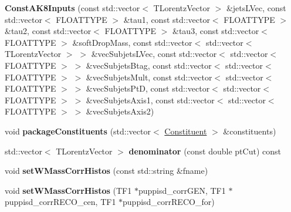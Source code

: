 \begin{DoxyCompactItemize}
\item 
\hypertarget{classttUtility_1_1ConstAK8Inputs_a1376ef57da464077cf28555182ac6ed0}{{\bfseries Const\-A\-K8\-Inputs} (const std\-::vector$<$ T\-Lorentz\-Vector $>$ \&jets\-L\-Vec, const std\-::vector$<$ F\-L\-O\-A\-T\-T\-Y\-P\-E $>$ \&tau1, const std\-::vector$<$ F\-L\-O\-A\-T\-T\-Y\-P\-E $>$ \&tau2, const std\-::vector$<$ F\-L\-O\-A\-T\-T\-Y\-P\-E $>$ \&tau3, const std\-::vector$<$ F\-L\-O\-A\-T\-T\-Y\-P\-E $>$ \&soft\-Drop\-Mass, const std\-::vector$<$ std\-::vector$<$ T\-Lorentz\-Vector $>$ $>$ \&vec\-Subjets\-L\-Vec, const std\-::vector$<$ std\-::vector$<$ F\-L\-O\-A\-T\-T\-Y\-P\-E $>$ $>$ \&vec\-Subjets\-Btag, const std\-::vector$<$ std\-::vector$<$ F\-L\-O\-A\-T\-T\-Y\-P\-E $>$ $>$ \&vec\-Subjets\-Mult, const std\-::vector$<$ std\-::vector$<$ F\-L\-O\-A\-T\-T\-Y\-P\-E $>$ $>$ \&vec\-Subjets\-Pt\-D, const std\-::vector$<$ std\-::vector$<$ F\-L\-O\-A\-T\-T\-Y\-P\-E $>$ $>$ \&vec\-Subjets\-Axis1, const std\-::vector$<$ std\-::vector$<$ F\-L\-O\-A\-T\-T\-Y\-P\-E $>$ $>$ \&vec\-Subjets\-Axis2)}\label{classttUtility_1_1ConstAK8Inputs_a1376ef57da464077cf28555182ac6ed0}

\item 
\hypertarget{classttUtility_1_1ConstAK8Inputs_a43432eb98408e074ba5a2f329cd35028}{void {\bfseries package\-Constituents} (std\-::vector$<$ \hyperlink{classConstituent}{Constituent} $>$ \&constituents)}\label{classttUtility_1_1ConstAK8Inputs_a43432eb98408e074ba5a2f329cd35028}

\item 
\hypertarget{classttUtility_1_1ConstAK8Inputs_ab30438c09182769fba7c12d506a677a3}{std\-::vector$<$ T\-Lorentz\-Vector $>$ {\bfseries denominator} (const double pt\-Cut) const }\label{classttUtility_1_1ConstAK8Inputs_ab30438c09182769fba7c12d506a677a3}

\item 
\hypertarget{classttUtility_1_1ConstAK8Inputs_a5734dc3413d1131ded1fcd3e7d29fcd1}{void {\bfseries set\-W\-Mass\-Corr\-Histos} (const std\-::string \&fname)}\label{classttUtility_1_1ConstAK8Inputs_a5734dc3413d1131ded1fcd3e7d29fcd1}

\item 
\hypertarget{classttUtility_1_1ConstAK8Inputs_a4409e140d025cf8f277934975715d512}{void {\bfseries set\-W\-Mass\-Corr\-Histos} (T\-F1 $\ast$puppisd\-\_\-corr\-G\-E\-N, T\-F1 $\ast$puppisd\-\_\-corr\-R\-E\-C\-O\-\_\-cen, T\-F1 $\ast$puppisd\-\_\-corr\-R\-E\-C\-O\-\_\-for)}\label{classttUtility_1_1ConstAK8Inputs_a4409e140d025cf8f277934975715d512}

\end{DoxyCompactItemize}
